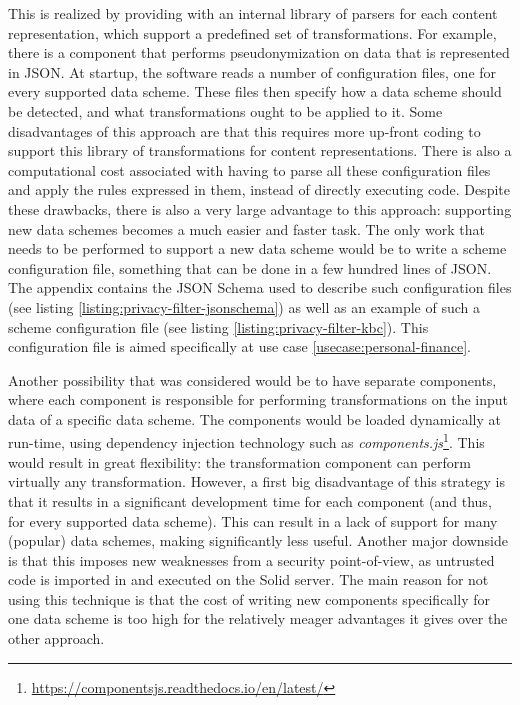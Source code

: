 This is realized by providing \middleware{} with an internal library of parsers for each content representation, which support a predefined set of transformations. For example, there is a component that performs pseudonymization on data that is represented in JSON. At startup, the software reads a number of configuration files, one for every supported data scheme. These files then specify how a data scheme should be detected, and what transformations ought to be applied to it. Some disadvantages of this approach are that this requires more up-front coding to support this library of transformations for content representations. There is also a computational cost associated with having to parse all these configuration files and apply the rules expressed in them, instead of directly executing code. Despite these drawbacks, there is also a very large advantage to this approach: supporting new data schemes becomes a much easier and faster task. The only work that needs to be performed to support a new data scheme would be to write a scheme configuration file, something that can be done in a few hundred lines of JSON. The appendix contains the JSON Schema used to describe such configuration files (see listing \ref{listing:privacy-filter-jsonschema}) as well as an example of such a scheme configuration file (see listing \ref{listing:privacy-filter-kbc}). This configuration file is aimed specifically at use case \ref{usecase:personal-finance}.

\noindent Another possibility that was considered would be to have separate components, where each component is responsible for performing transformations on the input data of a specific data scheme. The components would be loaded dynamically at run-time, using dependency injection technology such as \textit{components.js}\footnote{\url{https://componentsjs.readthedocs.io/en/latest/}}. This would result in great flexibility: the transformation component can perform virtually any transformation. However, a first big disadvantage of this strategy is that it results in a significant development time for each component (and thus, for every supported data scheme). This can result in a lack of support for many (popular) data schemes, making \middleware{} significantly less useful. Another major downside is that this imposes new weaknesses from a security point-of-view, as untrusted code is imported in and executed on the Solid server. The main reason for not using this technique is that the cost of writing new components specifically for one data scheme is too high for the relatively meager advantages it gives over the other approach. 


